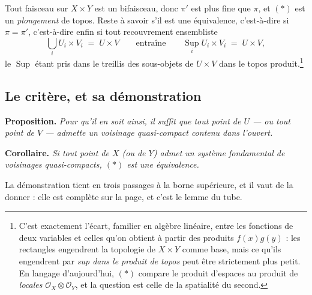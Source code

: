 \documentclass[11pt,a4paper]{article}
\begin{document}
Tout faisceau sur $X \times Y$ est un bifaisceau, donc $\pi'$ est plus fine que
$\pi$, et $(*)$ est un \emph{plongement} de topos. Reste à savoir s'il est une
équivalence, c'est-à-dire si $\pi = \pi'$, c'est-à-dire enfin si tout
recouvrement ensembliste
\[
\bigcup_{i} U_{i} \times V_{i} \;=\; U \times V
\qquad\text{entraîne}\qquad
\operatorname*{Sup}_{i} U_{i} \times V_{i} \;=\; U \times V,
\]
le $\operatorname{Sup}$ étant pris dans le treillis des sous-objets de
$U \times V$ dans le topos produit.\footnote{C'est exactement l'écart, familier
en algèbre linéaire, entre les fonctions de deux variables et celles qu'on
obtient à partir des produits $f(x)g(y)$ : les rectangles engendrent la
topologie de $X \times Y$ comme base, mais ce qu'ils engendrent par
\emph{sup dans le produit de topos} peut être strictement plus petit. En
langage d'aujourd'hui, $(*)$ compare le produit d'espaces au produit de
\emph{locales} $\mathcal{O}_{X} \otimes \mathcal{O}_{Y}$, et la question est
celle de la spatialité du second.}

\subsection*{Le critère, et sa démonstration}

\textbf{Proposition.} \emph{Pour qu'il en soit ainsi, il suffit que tout point
de $U$ — ou tout point de $V$ — admette un voisinage quasi-compact contenu dans
l'ouvert.}

\textbf{Corollaire.} \emph{Si tout point de $X$ (ou de $Y$) admet un système
fondamental de voisinages quasi-compacts, $(*)$ est une équivalence.}

La démonstration tient en trois passages à la borne supérieure, et il vaut de
la donner : elle est complète sur la page, et c'est le lemme du tube.
\end{document}

